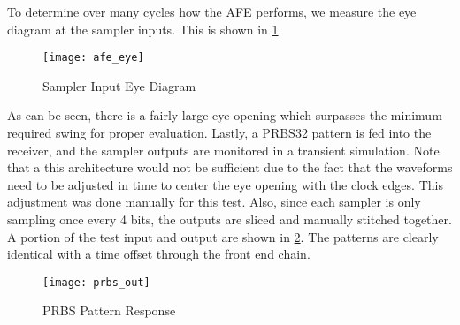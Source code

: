 To determine over many cycles how the AFE performs, we measure the eye diagram at the sampler inputs. This is shown in \ref{fig:eye}.
\begin{figure}[h]
\centering
\texttt{[image: afe\_eye]}
\caption{Sampler Input Eye Diagram}
\label{fig:eye}
\end{figure}
As can be seen, there is a fairly large eye opening which surpasses the minimum required swing for proper evaluation.
\clearpage
Lastly, a PRBS32 pattern is fed into the receiver, and the sampler outputs are monitored in a transient simulation. Note that a this architecture would not be sufficient due to the fact that the waveforms need to be adjusted in time to center the eye opening with the clock edges. This adjustment was done manually for this test. Also, since each sampler is only sampling once every 4 bits, the outputs are sliced and manually stitched together. A portion of the test input and output are shown in \ref{fig:prbs}. The patterns are clearly identical with a time offset through the front end chain.
\begin{figure}[h]
\centering
\texttt{[image: prbs\_out]}
\caption{PRBS Pattern Response}
\label{fig:prbs}
\end{figure}
\clearpage
